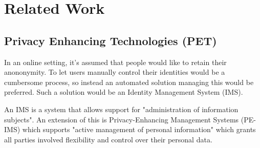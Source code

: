
\section{Related Work}



\subsection{Privacy Enhancing Technologies (PET)}


In an online setting, it's assumed that people would like to retain their anononymity.\cite{hansen2004privacy} To let users manually control their identities would be a cumbersome process, so instead an automated solution managing this would be preferred. Such a solution would be an Identity Management System (IMS).

An IMS is a system that allows support for "administration of information subjects". An extension of this is Privacy-Enhancing Management Systems (PE-IMS) which supports "active management of personal information" which grants all parties involved flexibility and control over their personal data.





